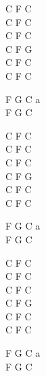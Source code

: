 \begin{chord}
    C F C\\
    C F C\\
    C F C\\
    C F G\\
    C F C\\
    C F C

    F G C a\\
    F G C

    C F C\\
    C F C\\
    C F C\\
    C F G\\
    C F C\\
    C F C

    F G C a\\
    F G C

    C F C\\
    C F C\\
    C F C\\
    C F G\\
    C F C\\
    C F C

    F G C a\\
    F G C
\end{chord}